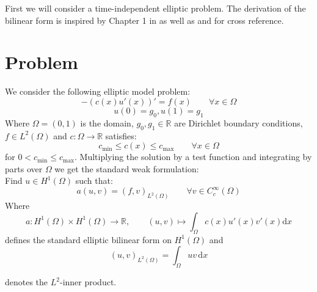 First we will consider a time-independent elliptic problem. The derivation
of the bilinear form is inspired by 
Chapter 1 in \cite{riviere2008} as well as \cite{georgoulis2011Springer} and \cite{grote2006}
for cross reference.

\section{Problem}
We consider the following elliptic model problem:
\begin{equation}
    \label{eq:elliptic_pde}
    -(c(x)u'(x))' = f(x) \qquad \forall x\in \Omega
\end{equation} 
\begin{equation}
    \label{eq:elliptic_pde_bc}
    u(0) = g_0, u(1) = g_1
\end{equation}
Where $\Omega = (0,1)$ is the domain, $g_0, g_1 \in \mathbb{R}$ are
Dirichlet boundary conditions, $f \in L^2(\Omega)$ and $c:\Omega \to \mathbb{R}$
satisfies:
\[
    c_{\min} \leq c(x) \leq c_{\max} \qquad \forall x\in \Omega
\]
for $0 < c_{\min} \leq c_{\max}$.
Multiplying the solution by a test function and integrating by parts over $\Omega$ we get the 
standard weak formulation: \\
Find $u \in H^1(\Omega)$ such that:
\begin{equation}
    a(u,v) = (f,v)_{L^2(\Omega)} \qquad \forall v \in C_c^{\infty}(\Omega)
\end{equation}
Where 
\[
    a:H^1(\Omega) \times H^1(\Omega) \to \mathbb{R}, \qquad (u,v) \mapsto \int_{\Omega} c(x)u'(x)v'(x) \text{d}x
\]  
defines the standard elliptic bilinear form on $H^1(\Omega)$ and 
\[
    (u,v)_{L^2(\Omega)} = \int_{\Omega} uv \,\text{d}x
\]

denotes the $L^2$-inner product.

